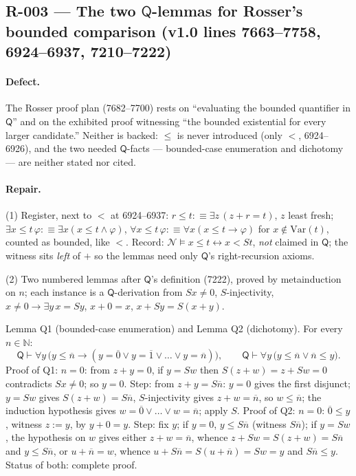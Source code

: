 \subsection*{R-003 --- The two \(\mathsf{Q}\)-lemmas for Rosser's bounded comparison (v1.0 lines 7663--7758, 6924--6937, 7210--7222)}

\paragraph{Defect.} The Rosser proof plan (7682--7700) rests on ``evaluating the bounded quantifier in \(\mathsf Q\)'' and on the exhibited proof witnessing ``the bounded existential for every larger candidate.''  Neither is backed: \(\leq\) is never introduced (only \(<\), 6924--6926), and the two needed \(\mathsf Q\)-facts --- bounded-case enumeration and dichotomy --- are neither stated nor cited.

\paragraph{Repair.} (1) Register, next to \(<\) at 6924--6937: \(r\leq t:\equiv\exists z\,(z+r=t)\), \(z\) least fresh; \(\exists x\!\leq\! t\,\varphi:\equiv\exists x(x\leq t\land\varphi)\), \(\forall x\!\leq\! t\,\varphi:\equiv\forall x(x\leq t\to\varphi)\) for \(x\notin\mathrm{Var}(t)\), counted as bounded, like \(<\).  Record: \(\mathcal N\models x\leq t\leftrightarrow x<St\), \emph{not} claimed in \(\mathsf Q\); the witness sits \emph{left} of \(+\) so the lemmas need only \(\mathsf Q\)'s right-recursion axioms.

(2) Two numbered lemmas after \(\mathsf Q\)'s definition (7222), proved by metainduction on \(n\); each instance is a \(\mathsf Q\)-derivation from \(Sx\neq0\), \(S\)-injectivity, \(x\neq0\to\exists y\,x=Sy\), \(x+0=x\), \(x+Sy=S(x+y)\).

Lemma Q1 (bounded-case enumeration) and Lemma Q2 (dichotomy).  For every \(n\in\mathbb N\):
\[
  \mathsf Q\vdash\forall y\,\bigl(y\leq\overline n\to(y=\overline0\lor y=\overline1\lor\dots\lor y=\overline n)\bigr),
  \qquad
  \mathsf Q\vdash\forall y\,\bigl(y\leq\overline n\lor\overline n\leq y\bigr).
\]
Proof of Q1: \(n=0\): from \(z+y=0\), if \(y=Sw\) then \(S(z+w)=z+Sw=0\) contradicts \(Sx\neq0\); so \(y=0\).  Step: from \(z+y=S\overline n\): \(y=0\) gives the first disjunct; \(y=Sw\) gives \(S(z+w)=S\overline n\), \(S\)-injectivity gives \(z+w=\overline n\), so \(w\leq\overline n\); the induction hypothesis gives \(w=\overline0\lor\dots\lor w=\overline n\); apply \(S\).  Proof of Q2: \(n=0\): \(\overline0\leq y\), witness \(z:=y\), by \(y+0=y\).  Step: fix \(y\); if \(y=0\), \(y\leq S\overline n\) (witness \(S\overline n\)); if \(y=Sw\), the hypothesis on \(w\) gives either \(z+w=\overline n\), whence \(z+Sw=S(z+w)=S\overline n\) and \(y\leq S\overline n\), or \(u+\overline n=w\), whence \(u+S\overline n=S(u+\overline n)=Sw=y\) and \(S\overline n\leq y\).  Status of both: complete proof.

